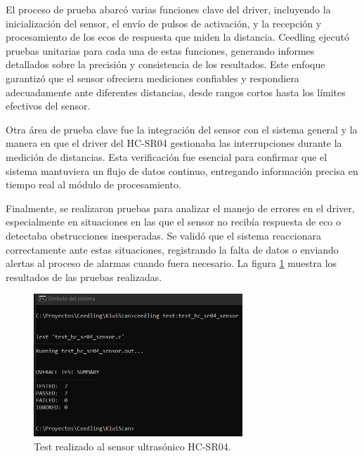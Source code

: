 El proceso de prueba abarcó varias funciones clave del driver, incluyendo la inicialización del sensor, el envío de pulsos de activación, y la recepción y procesamiento de los ecos de respuesta que miden la distancia. Ceedling ejecutó pruebas unitarias para cada una de estas funciones, generando informes detallados sobre la precisión y consistencia de los resultados. Este enfoque garantizó que el sensor ofreciera mediciones confiables y respondiera adecuadamente ante diferentes distancias, desde rangos cortos hasta los límites efectivos del sensor.

Otra área de prueba clave fue la integración del sensor con el sistema general y la manera en que el driver del HC-SR04 gestionaba las interrupciones durante la medición de distancias. Esta verificación fue esencial para confirmar que el sistema mantuviera un flujo de datos continuo, entregando información precisa en tiempo real al módulo de procesamiento.

Finalmente, se realizaron pruebas para analizar el manejo de errores en el driver, especialmente en situaciones en las que el sensor no recibía respuesta de eco o detectaba obstrucciones inesperadas. Se validó que el sistema reaccionara correctamente ante estas situaciones, registrando la falta de datos o enviando alertas al proceso de alarmas cuando fuera necesario. La figura \ref{fig:test_hc_sr04_sensor} muestra los resultados de las pruebas realizadas.

\newpage

\vspace{1cm}

\begin{figure}[htbp]
	\centering
	\includegraphics[width=0.7\textwidth, height=0.3\textheight]{./Figures/test_hc_sr04_sensor.png}
	\caption{Test realizado al sensor ultrasónico HC-SR04.}
	\label{fig:test_hc_sr04_sensor}
\end{figure}

